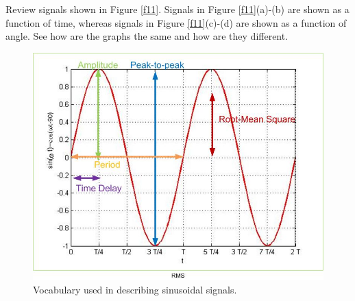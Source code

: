 \documentclass{ximera}
\begin{document}
Review signals shown in Figure \ref{f11}. Signals in Figure \ref{f11}(a)-(b) are shown as a function of time, whereas signals in Figure \ref{f11}(c)-(d) are shown as a function of angle. See how are the graphs the same and how are they different. 

\begin{figure}[htbp]
\begin{center}
\includegraphics[scale=0.8]{jpg/sinusoid.jpg}
\end{center}
\caption{Vocabulary used in describing sinusoidal signals.}
\label{sinusoid}
\end{figure} 
\end{document}
